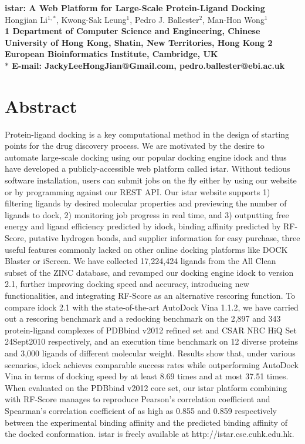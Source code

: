 \documentclass[10pt]{article}
\date{}
\begin{document}
\begin{flushleft}
{\Large
\textbf{istar: A Web Platform for Large-Scale Protein-Ligand Docking}
}
\\
Hongjian Li$^{1,\ast}$, 
Kwong-Sak Leung$^{1}$, 
Pedro J. Ballester$^{2}$,
Man-Hon Wong$^{1}$
\\
\bf{1} Department of Computer Science and Engineering, Chinese University of Hong Kong, Shatin, New Territories, Hong Kong
\bf{2} European Bioinformatics Institute, Cambridge, UK
\\
$\ast$ E-mail: JackyLeeHongJian@Gmail.com, pedro.ballester@ebi.ac.uk
\end{flushleft}

\section*{Abstract}
Protein-ligand docking is a key computational method in the design of starting points for the drug discovery process. We are motivated by the desire to automate large-scale docking using our popular docking engine idock and thus have developed a publicly-accessible web platform called istar. Without tedious software installation, users can submit jobs on the fly either by using our website or by programming against our REST API. Our istar website supports 1) filtering ligands by desired molecular properties and previewing the number of ligands to dock, 2) monitoring job progress in real time, and 3) outputting free energy and ligand efficiency predicted by idock, binding affinity predicted by RF-Score, putative hydrogen bonds, and supplier information for easy purchase, three useful features commonly lacked on other online docking platforms like DOCK Blaster or iScreen. We have collected 17,224,424 ligands from the All Clean subset of the ZINC database, and revamped our docking engine idock to version 2.1, further improving docking speed and accuracy, introducing new functionalities, and integrating RF-Score as an alternative rescoring function. To compare idock 2.1 with the state-of-the-art AutoDock Vina 1.1.2, we have carried out a rescoring benchmark and a redocking benchmark on the 2,897 and 343 protein-ligand complexes of PDBbind v2012 refined set and CSAR NRC HiQ Set 24Sept2010 respectively, and an execution time benchmark on 12 diverse proteins and 3,000 ligands of different molecular weight. Results show that, under various scenarios, idock achieves comparable success rates while outperforming AutoDock Vina in terms of docking speed by at least 8.69 times and at most 37.51 times. When evaluated on the PDBbind v2012 core set, our istar platform combining with RF-Score manages to reproduce Pearson's correlation coefficient and Spearman's correlation coefficient of as high as 0.855 and 0.859 respectively between the experimental binding affinity and the predicted binding affinity of the docked conformation. istar is freely available at http://istar.cse.cuhk.edu.hk.
\end{document}
